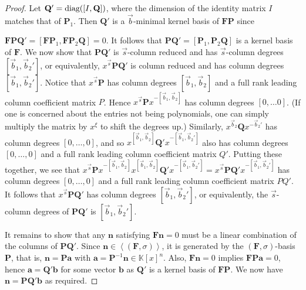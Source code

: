 \begin{proof}
Let $\mathbf{Q}'=\mbox{diag}(\left[I,\mathbf{Q}\right])$, where the dimension
of the identity matrix $I$ matches that of $\mathbf{P}_{1}.$ Then
$\mathbf{Q}'$ is a $\vec{b}$-minimal kernel basis of $\mathbf{F}\mathbf{P}$
since %
\begin{comment}
$\mathbf{F}\mathbf{P}=\left[0,\mathbf{F}\mathbf{P}_{2}\right]$ and 
\end{comment}
{} $\mathbf{F}\mathbf{P}\mathbf{Q}'=\left[\mathbf{F}\mathbf{P}_{1},\mathbf{F}\mathbf{P}_{2}\mathbf{Q}\right]=0$.
It follows that $\mathbf{P}\mathbf{Q}'=\left[\mathbf{P}_{1},\mathbf{P}_{2}\mathbf{Q}\right]$
is a kernel basis of $\mathbf{F}$. We now show that $\mathbf{P}\mathbf{Q}'$
is $\vec{s}$-column reduced and has $\vec{s}$-column degrees $[\vec{b}_{1},\vec{b}_{2}']$,
or equivalently, $x^{\vec{s}}\mathbf{P}\mathbf{Q}'$ is column reduced
and has column degrees $[\vec{b}_{1},\vec{b}_{2}']$. Notice that
$x^{\vec{s}}\mathbf{P}$ has column degrees $[\vec{b}_{1},\vec{b}_{2}]$
and a full rank leading column coefficient matrix $P$. Hence $x^{\vec{s}}\mathbf{P}x^{-[\vec{b}_{1},\vec{b}_{2}]}$
has column degrees $\left[0,\dots0\right]$. (If one is concerned
about the entries not being polynomials, one can simply multiply the
matrix by $x^{\xi}$ to shift the degrees up.) Similarly, $x^{\vec{b}_{2}}\mathbf{Q}x^{-\vec{b}_{2}'}$
has column degrees $[0,\dots,0]$, and so $x^{[\vec{b}_{1},\vec{b}_{2}]}\mathbf{Q}'x^{-[\vec{b}_{1},\vec{b}_{2}']}$
also has column degrees $[0,\dots,0]$ and a full rank leading column
coefficient matrix $Q'$. Putting these together, we see that $x^{\vec{s}}\mathbf{P}x^{-[\vec{b}_{1},\vec{b}_{2}]}x^{[\vec{b}_{1},\vec{b}_{2}]}\mathbf{Q}'x^{-[\vec{b}_{1},\vec{b}_{2}']}=x^{\vec{s}}\mathbf{P}\mathbf{Q}'x^{-[\vec{b}_{1},\vec{b}_{2}']}$
has column degrees $[0,\dots,0]$ and a full rank leading column coefficient
matrix $PQ'$. It follows that $x^{\vec{s}}\mathbf{P}\mathbf{Q}'$
has column degrees $[\vec{b}_{1},\vec{b}_{2}']$, or equivalently,
the $\vec{s}$-column degrees of $\mathbf{PQ}'$ is $[\vec{b}_{1},\vec{b}_{2}']$.

It remains to show that any $\mathbf{n}$ satisfying $\mathbf{F}\mathbf{n}=0$
must be a linear combination of the columns of $\mathbf{PQ}'$. Since
$\mathbf{n}\in\left\langle \left(\mathbf{F},\sigma\right)\right\rangle $,
it is generated by the $\left(\mathbf{F},\sigma\right)$-basis $\mathbf{P}$,
that is, $\mathbf{n}=\mathbf{P}\mathbf{a}$ with $\mathbf{a}=\mathbf{P}^{-1}\mathbf{n}\in\mathbb{K}\left[x\right]^{n}$.
Also, $\mathbf{F}\mathbf{n}=0$ implies $\mathbf{F}\mathbf{P}\mathbf{a}=0$,
hence $\mathbf{a}=\mathbf{Q}'\mathbf{b}$ for some vector $\mathbf{b}$
as $\mathbf{Q}'$ is a kernel basis of $\mathbf{F}\mathbf{P}$. We
now have $\mathbf{n}=\mathbf{P}\mathbf{Q}'\mathbf{b}$ as required.\end{proof}
